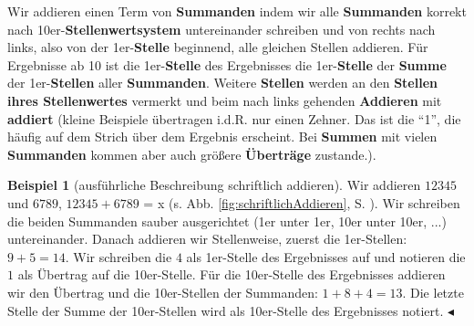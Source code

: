 \documentclass[a4paper]{book}%
\newcommand{\topicend}{
      $\blacktriangleleft$
}
\theoremstyle{definition}
\newtheorem{beispiel}{Beispiel}
\begin{document}
Wir addieren einen Term von \textbf{Summanden} indem wir alle \textbf{Summanden} korrekt nach 10er-\textbf{Stellenwertsystem} untereinander schreiben und von rechts nach links, also von der 1er-\textbf{Stelle} beginnend, alle gleichen Stellen addieren. Für Ergebnisse ab 10 ist die 1er-\textbf{Stelle} des Ergebnisses die 1er-\textbf{Stelle} der \textbf{Summe} der 1er-\textbf{Stellen} aller \textbf{Summanden}. Weitere \textbf{Stellen} werden an den \textbf{Stellen ihres Stellenwertes} vermerkt und beim nach links gehenden \textbf{Addieren} mit \textbf{addiert} (kleine Beispiele übertragen i.d.R. nur einen Zehner. Das ist die  \enquote{1}, die häufig auf dem Strich über dem Ergebnis erscheint. Bei \textbf{Summen} mit vielen \textbf{Summanden} kommen aber auch größere \textbf{Überträge} zustande.).

\begin{beispiel}[ausführliche Beschreibung schriftlich addieren]
    Wir addieren $12345$ und $6789$, $12345 + 6789$ = x (s. Abb. \ref{fig:schriftlichAddieren}, S. \pageref{fig:schriftlichAddieren}). Wir schreiben die beiden Summanden sauber ausgerichtet (1er unter 1er, 10er unter 10er, ...) untereinander.  Danach addieren wir Stellenweise, zuerst die 1er-Stellen: $9+5=14$. Wir schreiben die $4$ als 1er-Stelle des Ergebnisses auf und notieren die $1$ als Übertrag auf die 10er-Stelle. Für die 10er-Stelle des Ergebnisses addieren wir den Übertrag und die 10er-Stellen der Summanden: $1+8+4=13$. Die letzte Stelle der Summe der 10er-Stellen wird als 10er-Stelle des Ergebnisses notiert.\topicend
\end{beispiel}
\end{document}

